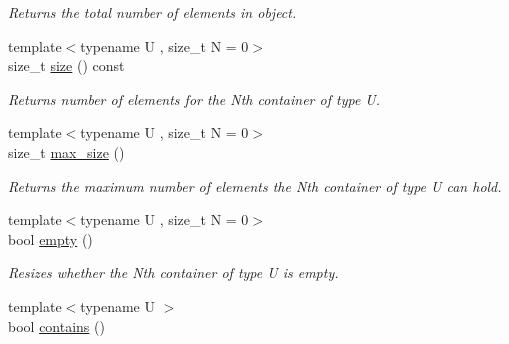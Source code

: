 \begin{DoxyCompactItemize}
\begin{DoxyCompactList}\small\item\em Returns the total number of elements in object. \end{DoxyCompactList}\item 
\hypertarget{classheterogeneous_1_1heterolist_3_01_t_00_01_types_8_8_8_4_a850c2777ce54854c38dc764cdaa200a0}{}{\footnotesize template$<$typename U , size\+\_\+t N = 0$>$ }\\size\+\_\+t \hyperlink{classheterogeneous_1_1heterolist_3_01_t_00_01_types_8_8_8_4_a850c2777ce54854c38dc764cdaa200a0}{size} () const \label{classheterogeneous_1_1heterolist_3_01_t_00_01_types_8_8_8_4_a850c2777ce54854c38dc764cdaa200a0}

\begin{DoxyCompactList}\small\item\em Returns number of elements for the Nth container of type U. \end{DoxyCompactList}\item 
\hypertarget{classheterogeneous_1_1heterolist_3_01_t_00_01_types_8_8_8_4_a6897ac23add2333172aaa6d6ade62a17}{}{\footnotesize template$<$typename U , size\+\_\+t N = 0$>$ }\\size\+\_\+t \hyperlink{classheterogeneous_1_1heterolist_3_01_t_00_01_types_8_8_8_4_a6897ac23add2333172aaa6d6ade62a17}{max\+\_\+size} ()\label{classheterogeneous_1_1heterolist_3_01_t_00_01_types_8_8_8_4_a6897ac23add2333172aaa6d6ade62a17}

\begin{DoxyCompactList}\small\item\em Returns the maximum number of elements the Nth container of type U can hold. \end{DoxyCompactList}\item 
\hypertarget{classheterogeneous_1_1heterolist_3_01_t_00_01_types_8_8_8_4_aee32b8ddf5eec31eae11a35fc9a32b41}{}{\footnotesize template$<$typename U , size\+\_\+t N = 0$>$ }\\bool \hyperlink{classheterogeneous_1_1heterolist_3_01_t_00_01_types_8_8_8_4_aee32b8ddf5eec31eae11a35fc9a32b41}{empty} ()\label{classheterogeneous_1_1heterolist_3_01_t_00_01_types_8_8_8_4_aee32b8ddf5eec31eae11a35fc9a32b41}

\begin{DoxyCompactList}\small\item\em Resizes whether the Nth container of type U is empty. \end{DoxyCompactList}\item 
\hypertarget{classheterogeneous_1_1heterolist_3_01_t_00_01_types_8_8_8_4_ae3a8046d301a8a63e10bb7003cb45597}{}{\footnotesize template$<$typename U $>$ }\\bool \hyperlink{classheterogeneous_1_1heterolist_3_01_t_00_01_types_8_8_8_4_ae3a8046d301a8a63e10bb7003cb45597}{contains} ()\label{classheterogeneous_1_1heterolist_3_01_t_00_01_types_8_8_8_4_ae3a8046d301a8a63e10bb7003cb45597}


\end{DoxyCompactItemize}
